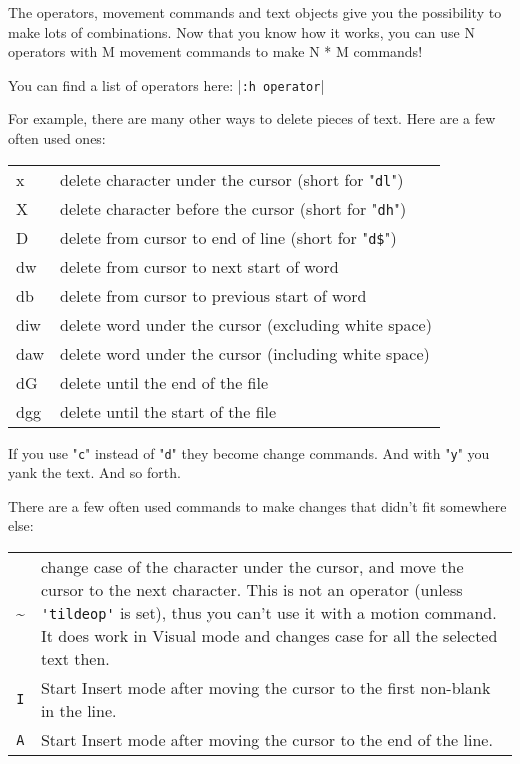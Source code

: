 The operators, movement commands and text objects give you the possibility to make lots of combinations.
Now that you know how it works, you can use N operators with M movement commands to make N * M commands!

You can find a list of operators here: |\verb!:h operator!|

For example, there are many other ways to delete pieces of text.
Here are a few often used ones:

\begin{longtable}{l l}
				x & delete character under the cursor (short for "\verb!dl!") \\
				X & delete character before the cursor (short for "\verb!dh!") \\
				D & delete from cursor to end of line (short for "\verb!d$!") \\
				dw & delete from cursor to next start of word \\
				db & delete from cursor to previous start of word \\
				diw & delete word under the cursor (excluding white space) \\
				daw & delete word under the cursor (including white space) \\
				dG & delete until the end of the file \\
				dgg & delete until the start of the file \\
\end{longtable}

If you use "\verb!c!" instead of "\verb!d!" they become change commands.
And with "\verb!y!" you yank the text.
And so forth.

There are a few often used commands to make changes that didn't fit somewhere else:

\begin{tabularx}{\textwidth}{c X}
				\textasciitilde & 
				change case of the character under the cursor, and move the cursor to the next character.
				This is not an operator (unless \verb!'tildeop'! is set), thus you can't use it with a motion command.
				It does work in Visual mode and changes case for all the selected text then. \\

				\texttt{I} &
				Start Insert mode after moving the cursor to the first non-blank in the line.\\

				\texttt{A} & 
				Start Insert mode after moving the cursor to the end of the line.
\end{tabularx}
\clearpage
